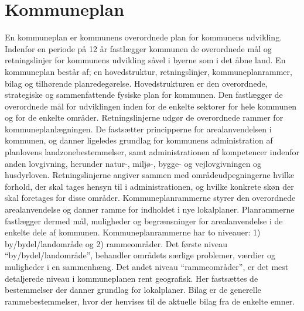 \chapter{Kommuneplan}
En kommuneplan er kommunens overordnede plan for kommunens udvikling. Indenfor en periode på 12 år fastlægger kommunen de overordnede mål og retningslinjer for kommunens udvikling såvel i byerne som i det åbne land. 
\newline
\newline
En kommuneplan består af; en hovedstruktur, retningslinjer, kommuneplanrammer, bilag og tilhørende planredegørelse. 
\newline \indent{     }  Hovedstrukturen er den overordnede, strategiske og sammenfattende fysiske plan for kommunen. Den fastlægger de overordnede mål for udviklingen inden for de enkelte sektorer for hele kommunen og for de enkelte områder. 
\newline \indent{     }  Retningslinjerne udgør de overordnede rammer for kommuneplanlægningen. De fastsætter principperne for arealanvendelsen i kommunen, og danner ligeledes grundlag for kommunens administration af planlovens landzonebestemmelser, samt administrationen af kompetencer indenfor anden lovgivning, herunder natur-, miljø-, bygge- og vejlovgivningen og husdyrloven. Retningslinjerne angiver sammen med områdeudpegningerne hvilke forhold, der skal tages hensyn til i administrationen, og hvilke konkrete skøn der skal foretages for disse områder. 
\newline \indent{     }  Kommuneplanrammerne styrer den overordnede arealanvendelse og danner ramme for indholdet i nye lokalplaner. Planrammerne fastlægger dermed mål, muligheder og begrænsninger for arealanvendelse i de enkelte dele af kommunen. Kommuneplanrammerne har to niveauer: 1) by/bydel/landområde og 2) rammeområder. Det første niveau “by/bydel/landområde”, behandler områdets særlige problemer, værdier og muligheder i en sammenhæng. Det andet niveau “rammeområder”, er det mest detaljerede niveau i kommuneplanen rent geografisk. Her fastsættes de bestemmelser der danner grundlag for lokalplaner.
\newline \indent{     }  Bilag er de generelle rammebestemmelser, hvor der henvises til de aktuelle bilag fra de enkelte emner.

